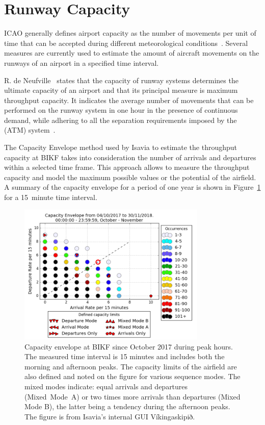 \section{Runway Capacity\label{sec:runway_capacity}}

ICAO generally defines airport capacity as the number of movements per unit of time that can be accepted during different meteorological conditions~\cite{airport_capacity_methodology}. 
Several measures are currently used to estimate the amount of aircraft movements on the runways of an airport in a specified time interval.

R. de Neufville~\cite{de_neufville_airport_2013} states that the capacity of runway systems determines the ultimate capacity of an airport and that its principal measure is maximum throughput capacity. It indicates the average number of movements that can be performed on the runway system in one hour in the presence of continuous demand, while adhering to all the separation requirements imposed by the (ATM) system~\cite{de_neufville_airport_2013}.

The Capacity Envelope method used by Isavia to estimate the throughput capacity at BIKF takes into consideration the number of arrivals and departures within a selected time frame. This approach allows to measure the throughput capacity and model the maximum possible values or the potential of the airfield. A summary of the capacity envelope for a period of one year is shown in Figure~\ref{fig:capacity_evnelope} for a 15~minute time interval. 

\begin{figure}[h]
    \centering
    \includegraphics[width=0.8\textwidth]{graphics/fig_Capacity_Envelope_2017-10-04_to_2018-11-30_15min_occurrences_limits.png}
    \caption[Capacity envelope for BIKF]{Capacity envelope at BIKF since October 2017 during peak hours. The measured time interval is 15 minutes and includes both the morning and afternoon peaks. The capacity limits of the airfield are also defined and noted on the figure for various sequence modes. The mixed modes indicate: equal arrivals and departures (Mixed~Mode~A) or two times more arrivals than departures (Mixed Mode B), the latter being a tendency during the afternoon peaks. The figure is from Isavia's internal GUI Víkingaskipið.}  \label{fig:capacity_evnelope}
\end{figure}

